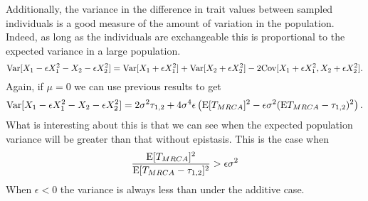 Additionally, the variance in the difference in trait values between sampled
individuals is a good measure of the amount of variation in the population.
Indeed, as long as the individuals are exchangeable this is proportional to the
expected variance in a large population.
\begin{equation*}
  \mathrm{Var}[X_1 - \epsilon X_1^2 - X_2 - \epsilon X_2^2] =
  \mathrm{Var}[X_1 + \epsilon X_1^2] + \mathrm{Var}[X_2 + \epsilon X_2^2] -
  2\mathrm{Cov}[X_1 + \epsilon X_1^2, X_2 + \epsilon X_2^2].
\end{equation*}
Again, if $\mu=0$ we can use previous results to get
\begin{equation*}
  \mathrm{Var}[X_1 - \epsilon X_1^2 - X_2 - \epsilon X_2^2] =
  2\sigma^2\tau_{1,2} + 4\sigma^4\epsilon \left( \mathrm{E}[T_{MRCA}]^2 -
  \epsilon \sigma^2 (\mathrm{E} T_{MRCA} - \tau_{1,2})^2 \right).
\end{equation*}
What is interesting about this is that we can see when the expected population
variance will be greater than that without epistasis. This is the case when
\begin{equation}
  \frac{\mathrm{E}[T_{MRCA}]^2}{\mathrm{E}[T_{MRCA}-\tau_{1,2}]^2} > \epsilon \sigma^2
\end{equation}
When $\epsilon < 0$ the variance is always less than under the additive case. 

